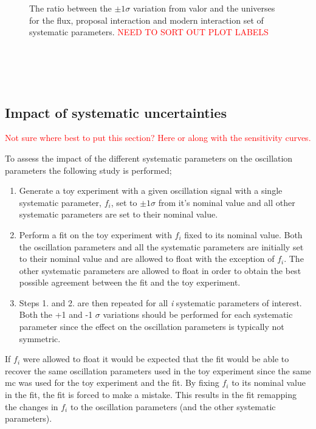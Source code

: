 \begin{figure}[h!]
  \captionsetup{width=0.49\textwidth}
  \parbox[b]{0.49\textwidth}%
  {
   \caption[The ratio between the $\pm 1 \sigma$ variation from \gls{valor} and the universes for the flux, proposal interaction and modern interaction set of systematics.]{The ratio between the $\pm 1 \sigma$ variation from \gls{valor} and the universes for the flux, proposal interaction and modern interaction set of systematic parameters. \textcolor{red}{NEED TO SORT OUT PLOT LABELS} \\\\\\\\\\}
   \label{fig:1sigma_variations_toys}}
\end{figure}

\subsection{Impact of systematic uncertainties}

\textcolor{red}{Not sure where best to put this section? Here or along with the sensitivity curves.}

To assess the impact of the different systematic parameters on the oscillation parameters the following study is performed;
\begin{enumerate}
    \item Generate a toy experiment with a given oscillation signal with a single systematic parameter, $f_i$, set to $\pm 1\sigma$ from it's nominal value and all other systematic parameters are set to their nominal value.
    \item Perform a fit on the toy experiment with $f_i$ fixed to its nominal value. Both the oscillation parameters and all the systematic parameters are initially set to their nominal value and are allowed to float with the exception of $f_i$. The other systematic parameters are allowed to float in order to obtain the best possible agreement between the fit and the toy experiment.
    \item Steps 1. and 2. are then repeated for all \textit{i} systematic parameters of interest. Both the +1 and -1 $\sigma$ variations should be performed for each systematic parameter since the effect on the oscillation parameters is typically not symmetric.  
\end{enumerate}
If $f_i$ were allowed to float it would be expected that the fit would be able to recover the same oscillation parameters used in the toy experiment since the same \gls{mc} was used for the toy experiment and the fit. By fixing $f_i$ to its nominal value in the fit, the fit is forced to make a mistake. This results in the fit remapping the changes in $f_i$ to the oscillation parameters (and the other systematic parameters). 


